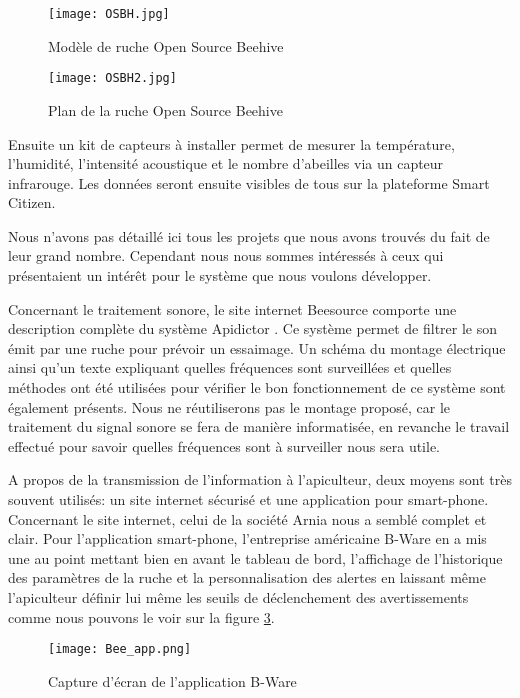 \begin{figure}[h]
\centering\texttt{[image: OSBH.jpg]}
\caption{\label{fig:OSBH} Modèle de ruche Open Source Beehive}
\end{figure}

\begin{figure}[h]
\centering\texttt{[image: OSBH2.jpg]}
\caption{\label{fig:OSBH2} Plan de la ruche Open Source Beehive}
\end{figure}

Ensuite un kit de capteurs à installer permet de mesurer la température, l'humidité, l'intensité acoustique et le nombre d'abeilles via un capteur infrarouge. Les données seront ensuite visibles de tous sur la plateforme Smart Citizen.

Nous n'avons pas détaillé ici tous les projets que nous avons trouvés du fait de leur grand nombre. Cependant nous nous sommes intéressés à ceux qui présentaient un intérêt pour le système que nous voulons développer. 

Concernant le traitement sonore, le site internet Beesource comporte une description complète du système Apidictor \cite{apidictor}. Ce système permet de filtrer le son émit par une ruche pour prévoir un essaimage. Un schéma du montage électrique ainsi qu'un texte expliquant quelles fréquences sont surveillées et quelles méthodes ont été utilisées pour vérifier le bon fonctionnement de ce système sont également présents. Nous ne réutiliserons pas le montage proposé, car le traitement du signal sonore se fera de manière informatisée, en revanche le travail effectué pour savoir quelles fréquences sont à surveiller nous sera utile.

A propos de la transmission de l'information à l'apiculteur, deux moyens sont très souvent utilisés: un site internet sécurisé et une application pour smart-phone. Concernant le site internet, celui de la société Arnia nous a semblé complet et clair. Pour l'application smart-phone, l'entreprise américaine B-Ware en a mis une au point mettant bien en avant le tableau de bord, l'affichage de l'historique des paramètres de la ruche et la personnalisation des alertes en laissant même l'apiculteur définir lui même les seuils de déclenchement des avertissements comme nous pouvons le voir sur la figure \ref{fig:app}.   

\begin{figure}[h]
\centering\texttt{[image: Bee\_app.png]}
\caption{\label{fig:app} Capture d'écran de l'application B-Ware}
\end{figure} 


